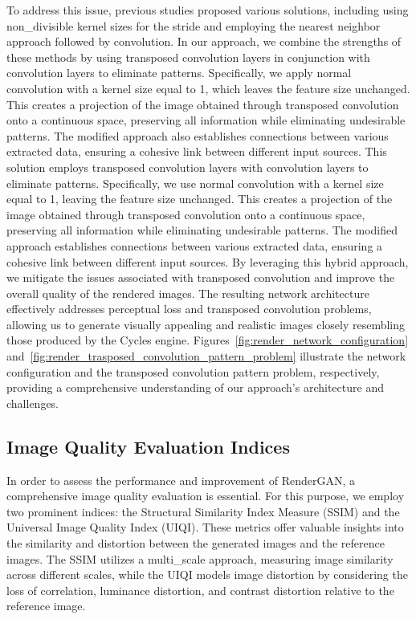 To address this issue, previous studies \cite{gauthier2014conditional, odena2016deconvolution} proposed various solutions, including using non_divisible kernel sizes for the stride and employing the nearest neighbor approach followed by convolution. In our approach, we combine the strengths of these methods by using transposed convolution layers in conjunction with convolution layers to eliminate patterns. Specifically, we apply normal convolution with a kernel size equal to 1, which leaves the feature size unchanged. This creates a projection of the image obtained through transposed convolution onto a continuous space, preserving all information while eliminating undesirable patterns. The modified approach also establishes connections between various extracted data, ensuring a cohesive link between different input sources. This solution employs transposed convolution layers with convolution layers to eliminate patterns. Specifically, we use normal convolution with a kernel size equal to 1, leaving the feature size unchanged. This creates a projection of the image obtained through transposed convolution onto a continuous space, preserving all information while eliminating undesirable patterns. The modified approach establishes connections between various extracted data, ensuring a cohesive link between different input sources. By leveraging this hybrid approach, we mitigate the issues associated with transposed convolution and improve the overall quality of the rendered images. The resulting network architecture effectively addresses perceptual loss and transposed convolution problems, allowing us to generate visually appealing and realistic images closely resembling those produced by the Cycles engine. Figures~\ref{fig:render_network_configuration} and~\ref{fig:render_trasposed_convolution_pattern_problem} illustrate the network configuration and the transposed convolution pattern problem, respectively, providing a comprehensive understanding of our approach's architecture and challenges.

\subsection{Image Quality Evaluation Indices}
In order to assess the performance and improvement of RenderGAN, a comprehensive image quality evaluation is essential. For this purpose, we employ two prominent indices: the Structural Similarity Index Measure (SSIM) and the Universal Image Quality Index (UIQI). These metrics offer valuable insights into the similarity and distortion between the generated images and the reference images. The SSIM utilizes a multi_scale approach, measuring image similarity across different scales, while the UIQI models image distortion by considering the loss of correlation, luminance distortion, and contrast distortion relative to the reference image. 

